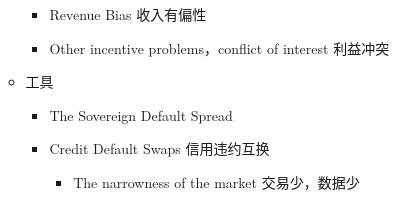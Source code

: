 \documentclass[a4paper,6pt,twoside,openany]{article}
\begin{document}
\begin{itemize}
\begin{itemize}
\begin{itemize}
    \item Revenue Bias 收入有偏性
    \item Other incentive problems，conflict of interest 利益冲突
    \end{itemize}
  \item 工具
    \begin{itemize}
    \item The Sovereign Default Spread
    \item Credit Default Swaps 信用违约互换
      \begin{itemize}
      \item The narrowness of the market 交易少，数据少
      \end{itemize}
    \end{itemize}
  \end{itemize}
\end{itemize}
\end{document}
